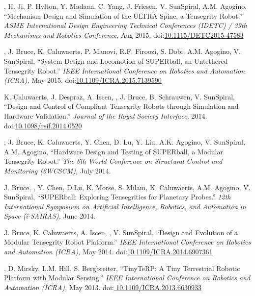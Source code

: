 \documentclass[letterpaper]{deedy-resume} %
\newcommand\doilink[1]{\href{http://dx.doi.org/#1}{#1}}
\newcommand\doi[1]{doi:\doilink{#1}}
\begin{document}
{\begin{etaremune}
\item \underline{{}}, H. Ji, P. Hylton, Y. Madaan, C. Yang, J. Friesen, V. SunSpiral, A.M. Agogino, ``Mechanism Design and Simulation of the ULTRA Spine, a Tensegrity Robot.'' {\it ASME International Design Engineering Technical Conferences (IDETC) / 39th Mechanisms and Robotics Conference}, Aug 2015. \doi{10.1115/DETC2015-47583}

\item \underline{{}}, J. Bruce, K. Caluwaerts, P. Manovi, R.F. Firoozi, S. Dobi, A.M. Agogino, V. SunSpiral, ``System Design and Locomotion of SUPERball, an Untethered Tensegrity Robot.'' {\it IEEE International Conference on Robotics and Automation (ICRA),} May 2015. \doi{10.1109/ICRA.2015.7139590}

\item K. Caluwaerts, J. Despraz, A. Iscen, \underline{{}}, J. Bruce, B. Schrauwen, V. SunSpiral, ``Design and Control of Compliant Tensegrity Robots through Simulation and Hardware Validation.'' {\it Journal of the Royal Society Interface,} 2014. \doi{10.1098/rsif.2014.0520}

\item \underline{{}}; J. Bruce, K. Caluwaerts, Y. Chen, D. Lu, Y. Liu, A.K. Agogino, V. SunSpiral, A.M. Agogino, ``Hardware Design and Testing of SUPERball, a Modular Tensegrity Robot.'' {\it The 6th World Conference on Structural Control and Monitoring (6WCSCM),} July 2014.

\item J. Bruce, \underline{{}}, Y. Chen, D.Lu, K. Morse, S. Milam, K. Caluwaerts, A.M. Agogino, V. SunSpiral, ``SUPERball: Exploring Tensegrities for Planetary Probes.'' {\it 12th International Symposium on Artificial Intelligence, Robotics, and Automation in Space (i-SAIRAS),} June 2014.

\item J. Bruce, K. Caluwaerts, A. Iscen, \underline{{}}, V. SunSpiral, ``Design and Evolution of a Modular Tensegrity Robot Platform.'' {\it IEEE International Conference on Robotics and Automation (ICRA),} May 2014. \doi{10.1109/ICRA.2014.6907361}

\item \underline{{}}, D. Mirsky, L.M. Hill, S. Bergbreiter, ``TinyTeRP: A Tiny Terrestrial Robotic Platform with Modular Sensing.'' {\it IEEE International Conference on Robotics and Automation (ICRA),} May 2013. \doi{ 10.1109/ICRA.2013.6630933}



\end{etaremune}}
\end{document}
